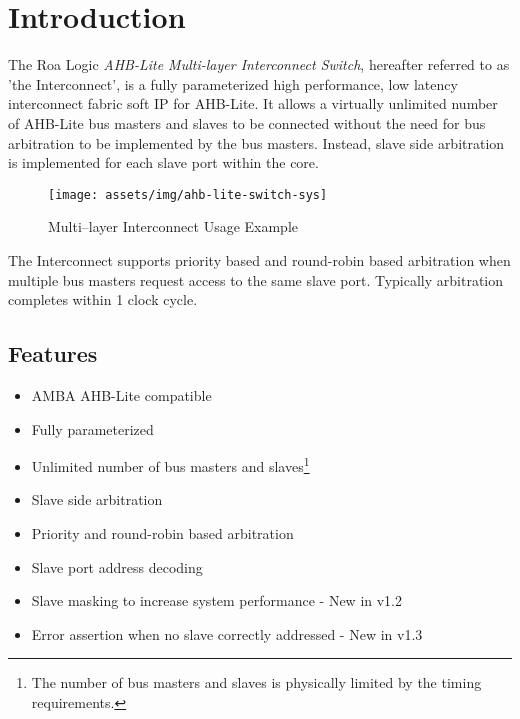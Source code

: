 \chapter{Introduction}\label{introduction}

The Roa Logic \emph{AHB-Lite Multi-layer Interconnect Switch}, hereafter referred to as 'the Interconnect', is a fully parameterized high performance, low latency interconnect fabric soft IP for AHB-Lite.
It allows a virtually unlimited number of AHB-Lite bus masters and
slaves to be connected without the need for bus arbitration to be
implemented by the bus masters. Instead, slave side arbitration is
implemented for each slave port within the core.

\begin{figure}[tbh]
  \centering
  \texttt{[image: assets/img/ahb-lite-switch-sys]}
  \caption{Multi--layer Interconnect Usage Example}
  \label{fig:ahb-lite-switch-sys}
\end{figure}


The Interconnect supports priority based and round-robin based
arbitration when multiple bus masters request access to the same slave
port. Typically arbitration completes within 1 clock cycle.

\section{Features}\label{features}

\begin{itemize}
\item
  AMBA AHB-Lite compatible
\item
  Fully parameterized
\item
  Unlimited number of bus masters and slaves\footnote{The number of bus
    masters and slaves is physically limited by the timing requirements.}
\item
  Slave side arbitration
\item
  Priority and round-robin based arbitration
\item
  Slave port address decoding
\item
  Slave masking to increase system performance - New in v1.2
\item
  Error assertion when no slave correctly addressed - New in v1.3
\end{itemize}
